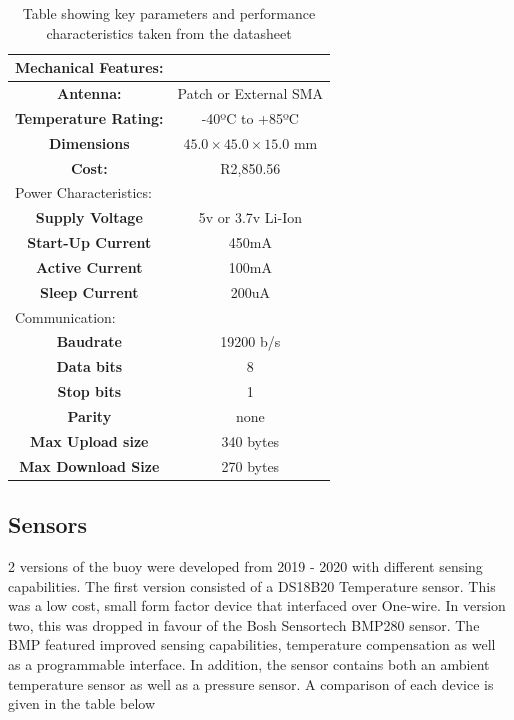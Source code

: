 \begin{table}[H]
    \centering
    \caption{Table showing key parameters and performance characteristics taken from the datasheet}
    \begin{tabular}{|c|c|}
        \multicolumn{2}{l}{Mechanical Features:}\\
        \hline
        \textbf{Antenna: } & Patch or External SMA\\
        \hline
        \textbf{Temperature Rating:} & -40ºC to +85ºC\\
        \hline
       \textbf{Dimensions}  & $45.0 \times 45.0 \times 15.0$ mm  \\
       \hline
        \textbf{Cost: } & R2,850.56\\
               \hline
       \multicolumn{2}{l}{Power Characteristics:}\\
       \hline
       \textbf{Supply Voltage} & 5v or 3.7v Li-Ion \\
       \hline
       \textbf{Start-Up Current} & 450mA \\
       \hline
       \textbf{Active Current} & 100mA \\
       \hline
       \textbf{Sleep Current} & 200uA\\
       \hline
        \multicolumn{2}{l}{Communication:}\\
        \hline
         \textbf{Baudrate} & 19200 b/s \\
        \hline
         \textbf{ Data bits} &  8\\
        \hline
         \textbf{Stop bits} & 1 \\
        \hline
         \textbf{Parity} & none \\
        \hline
        \textbf{Max Upload size} & 340 bytes \\
        \hline
        \textbf{Max Download Size} & 270 bytes \\
        \hline
    \end{tabular}

    \label{tab:ir_specs}
\end{table}

\subsection{Sensors}

2 versions of the buoy were developed from 2019 - 2020 with different sensing capabilities. The first version consisted of a DS18B20 Temperature sensor. This was a low cost, small form factor device that interfaced over One-wire. In version two, this was dropped in favour of the Bosh Sensortech BMP280 sensor. The BMP featured improved sensing capabilities, temperature compensation as well as a programmable interface. In addition, the sensor contains both an ambient temperature sensor as well as a pressure sensor. A comparison of each device is given in the table below

